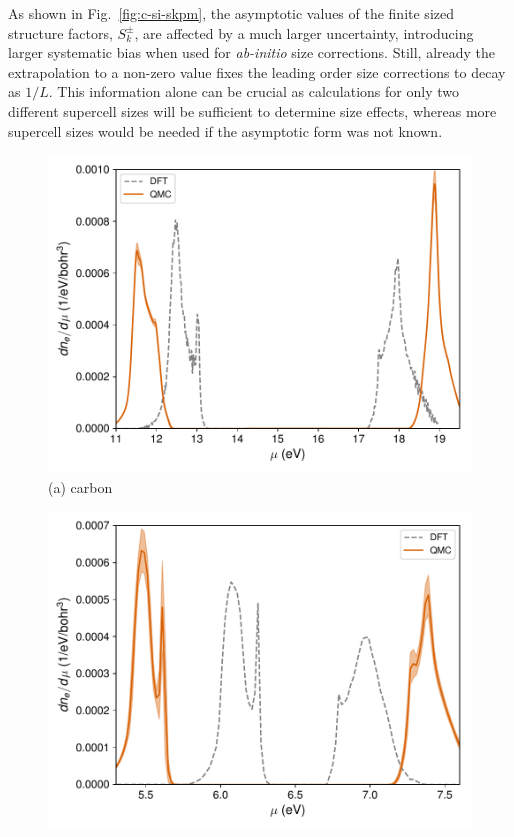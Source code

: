 As shown in Fig.~\ref{fig:c-si-skpm}, the asymptotic values of the finite sized structure factors,
$S_k^\pm$, are affected by a much larger uncertainty, introducing larger systematic bias when
used for \emph{ab-initio} size corrections. Still, already the extrapolation to a non-zero
value fixes the leading order size corrections to decay as $1/L$. This information alone can be
crucial as calculations for only two different supercell sizes will be sufficient to determine size effects, whereas more supercell sizes would be needed if the asymptotic form was not known.

\begin{figure}
\begin{minipage}{\columnwidth}
\includegraphics[width=\linewidth]{si35f_nf-c-dndmu}
(a) carbon
\end{minipage}
\begin{minipage}{\columnwidth}
\includegraphics[width=\linewidth]{si35f_nf-si-dndmu}

\end{minipage}
\end{figure}
